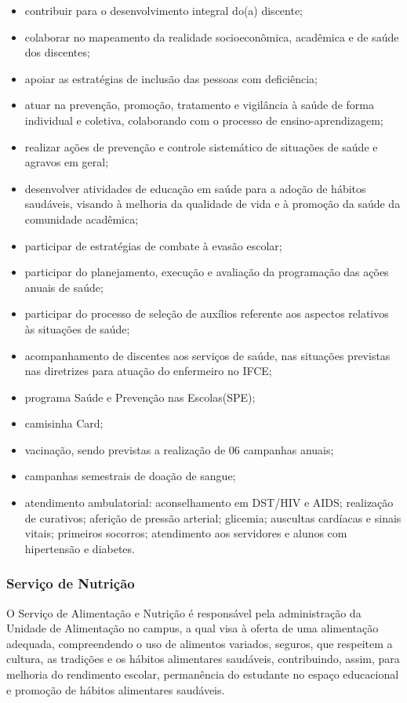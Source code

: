 \begin{itemize}
	\item contribuir para o desenvolvimento integral do(a) discente; 
	\item colaborar no mapeamento da realidade socioeconômica, acadêmica e de saúde dos discentes; 
	\item apoiar as estratégias de inclusão das pessoas com deficiência;
	\item atuar na prevenção, promoção, tratamento e vigilância à saúde de forma individual e coletiva, colaborando com o processo de ensino-aprendizagem; 
	\item realizar ações de prevenção e controle sistemático de situações de saúde e agravos em geral; 
	\item desenvolver atividades de educação em saúde para a adoção de hábitos saudáveis, visando à melhoria da qualidade de vida e à promoção da saúde da comunidade acadêmica; 
	\item participar de estratégias de combate à evasão escolar; 
	\item participar do planejamento, execução e avaliação da programação das ações anuais de saúde; 
	\item participar do processo de seleção de auxílios referente aos aspectos relativos às situações de saúde;
	\item acompanhamento de discentes aos serviços de saúde, nas situações previstas nas diretrizes para atuação do enfermeiro no IFCE;
	\item programa Saúde e Prevenção nas Escolas(SPE);
	\item camisinha Card;
	\item vacinação, sendo previstas a realização de 06 campanhas anuais;
	\item campanhas semestrais de doação de sangue;
	\item atendimento ambulatorial: aconselhamento em DST/HIV e AIDS; realização de curativos; aferição de pressão arterial; glicemia; auscultas cardíacas e sinais vitais; primeiros socorros; atendimento aos servidores e alunos com hipertensão e
	diabetes.
\end{itemize}

\subsubsection{Serviço de Nutrição} 

O Serviço de Alimentação e Nutrição é responsável pela administração da Unidade de Alimentação no campus, a qual visa à oferta de uma alimentação adequada, compreendendo o uso de alimentos variados, seguros, que respeitem a cultura, as tradições e os hábitos alimentares saudáveis, contribuindo, assim, para melhoria do rendimento escolar, permanência do estudante no espaço educacional e promoção de hábitos alimentares saudáveis.

